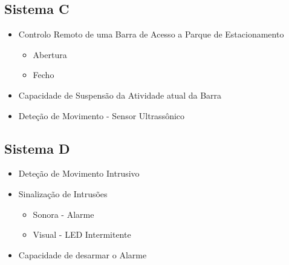 
\subsection{Sistema C}
\begin{itemize}
    \item Controlo Remoto de uma Barra de Acesso a Parque de Estacionamento
    \begin{itemize}
        \item Abertura
        \item Fecho
    \end{itemize}
    \item Capacidade de Suspensão da Atividade atual da Barra 
    \item Deteção de Movimento - Sensor Ultrassônico
\end{itemize}

\subsection{Sistema D}
\begin{itemize}
    \item Deteção de Movimento Intrusivo
    \item Sinalização de Intrusões
    \begin{itemize}
        \item Sonora - Alarme
        \item Visual - LED Intermitente
    \end{itemize}
    \item Capacidade de desarmar o Alarme
\end{itemize}